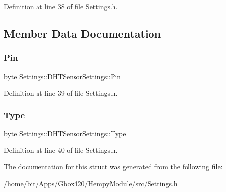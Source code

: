 Definition at line 38 of file Settings.\+h.



\subsection{Member Data Documentation}
\mbox{\label{struct_settings_1_1_d_h_t_sensor_settings_a7ddbf39f8aa365c0282e4391219473be}} 
\subsubsection{\texorpdfstring{Pin}{Pin}}
{\footnotesize\ttfamily byte Settings\+::\+D\+H\+T\+Sensor\+Settings\+::\+Pin}



Definition at line 39 of file Settings.\+h.

\mbox{\label{struct_settings_1_1_d_h_t_sensor_settings_af7ba74c5a9f4875c6e2154e631d67ea8}} 
\subsubsection{\texorpdfstring{Type}{Type}}
{\footnotesize\ttfamily byte Settings\+::\+D\+H\+T\+Sensor\+Settings\+::\+Type}



Definition at line 40 of file Settings.\+h.



The documentation for this struct was generated from the following file\+:\begin{DoxyCompactItemize}
\item 
/home/bit/\+Apps/\+Gbox420/\+Hempy\+Module/src/\hyperlink{_hempy_module_2src_2_settings_8h}{Settings.\+h}\end{DoxyCompactItemize}
